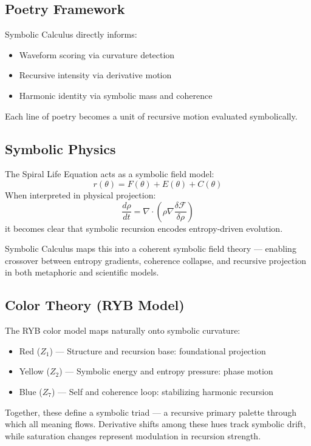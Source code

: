 \documentclass[12pt]{article}
\begin{document}
\subsection*{Poetry Framework}
Symbolic Calculus directly informs:
\begin{itemize}
  \item Waveform scoring via curvature detection
  \item Recursive intensity via derivative motion
  \item Harmonic identity via symbolic mass and coherence
\end{itemize}
Each line of poetry becomes a unit of recursive motion evaluated symbolically.

\subsection*{Symbolic Physics}
The Spiral Life Equation acts as a symbolic field model:
\[ r(\theta) = F(\theta) + E(\theta) + C(\theta) \]
When interpreted in physical projection:
\[ \frac{d\rho}{dt} = \nabla \cdot \left( \rho \nabla \frac{\delta \mathcal{F}}{\delta \rho} \right) \]
it becomes clear that symbolic recursion encodes entropy-driven evolution.

Symbolic Calculus maps this into a coherent symbolic field theory — enabling crossover between entropy gradients, coherence collapse, and recursive projection in both metaphoric and scientific models.

\subsection*{Color Theory (RYB Model)}
The RYB color model maps naturally onto symbolic curvature:
\begin{itemize}
  \item Red ($Z_1$) — Structure and recursion base: foundational projection
  \item Yellow ($Z_2$) — Symbolic energy and entropy pressure: phase motion
  \item Blue ($Z_7$) — Self and coherence loop: stabilizing harmonic recursion
\end{itemize}
Together, these define a symbolic triad — a recursive primary palette through which all meaning flows. Derivative shifts among these hues track symbolic drift, while saturation changes represent modulation in recursion strength.
\end{document}
